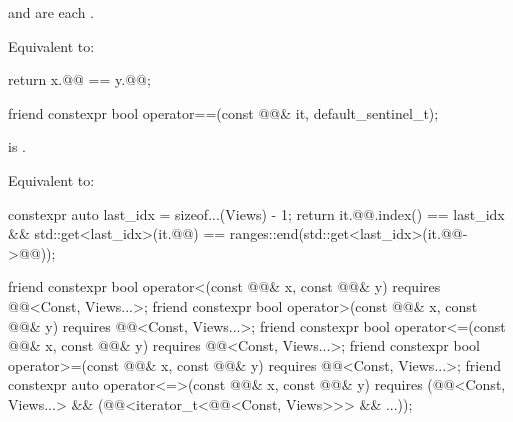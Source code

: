 \begin{itemdescr}
\pnum
\expects
{} and
 are each .

\pnum
\effects
Equivalent to:
\begin{codeblock}
return x.@@ == y.@@;
\end{codeblock}
\end{itemdescr}

%
\begin{itemdecl}
friend constexpr bool operator==(const @@& it, default_sentinel_t);
\end{itemdecl}

\begin{itemdescr}
\pnum
\expects
{} is .

\pnum
\effects
Equivalent to:
\begin{codeblock}
constexpr auto last_idx = sizeof...(Views) - 1;
return it.@@.index() == last_idx &&
       std::get<last_idx>(it.@@) == ranges::end(std::get<last_idx>(it.@@->@@));
\end{codeblock}
\end{itemdescr}

%
\begin{itemdecl}
friend constexpr bool operator<(const @@& x, const @@& y)
  requires @@<Const, Views...>;
friend constexpr bool operator>(const @@& x, const @@& y)
  requires @@<Const, Views...>;
friend constexpr bool operator<=(const @@& x, const @@& y)
  requires @@<Const, Views...>;
friend constexpr bool operator>=(const @@& x, const @@& y)
  requires @@<Const, Views...>;
friend constexpr auto operator<=>(const @@& x, const @@& y)
  requires (@@<Const, Views...> &&
            (@@<iterator_t<@@<Const, Views>>> && ...));
\end{itemdecl}

